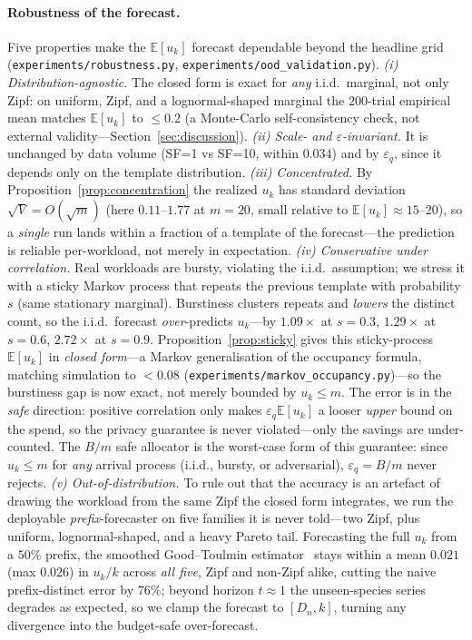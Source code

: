 \documentclass[sigconf,nonacm]{acmart}
\newcommand{\eps}{\varepsilon}
\newcommand{\E}{\mathbb{E}}
\begin{document}
\paragraph{Robustness of the forecast.} Five properties make the $\E[u_k]$ forecast dependable beyond the headline grid (\texttt{experiments/robustness.py}, \texttt{experiments/ood\_validation.py}). \emph{(i) Distribution-agnostic.} The closed form is exact for \emph{any} i.i.d.\ marginal, not only Zipf: on uniform, Zipf, and a lognormal-shaped marginal the $200$-trial empirical mean matches $\E[u_k]$ to $\le 0.2$ (a Monte-Carlo self-consistency check, not external validity---Section~\ref{sec:discussion}). \emph{(ii) Scale- and $\eps$-invariant.} It is unchanged by data volume (SF=1 vs SF=10, within $0.034$) and by $\eps_q$, since it depends only on the template distribution. \emph{(iii) Concentrated.} By Proposition~\ref{prop:concentration} the realized $u_k$ has standard deviation $\sqrt V=O(\sqrt m)$ (here $0.11$--$1.77$ at $m{=}20$, small relative to $\E[u_k]\approx15$--$20$), so a \emph{single} run lands within a fraction of a template of the forecast---the prediction is reliable per-workload, not merely in expectation. \emph{(iv) Conservative under correlation.} Real workloads are bursty, violating the i.i.d.\ assumption; we stress it with a sticky Markov process that repeats the previous template with probability $s$ (same stationary marginal). Burstiness clusters repeats and \emph{lowers} the distinct count, so the i.i.d.\ forecast \emph{over}-predicts $u_k$---by $1.09\times$ at $s{=}0.3$, $1.29\times$ at $s{=}0.6$, $2.72\times$ at $s{=}0.9$. Proposition~\ref{prop:sticky} gives this sticky-process $\E[u_k]$ in \emph{closed form}---a Markov generalisation of the occupancy formula, matching simulation to $<0.08$ (\texttt{experiments/markov\_occupancy.py})---so the burstiness gap is now exact, not merely bounded by $u_k\le m$. The error is in the \emph{safe} direction: positive correlation only makes $\eps_q\E[u_k]$ a looser \emph{upper} bound on the spend, so the privacy guarantee is never violated---only the savings are under-counted. The $B/m$ safe allocator is the worst-case form of this guarantee: since $u_k\le m$ for \emph{any} arrival process (i.i.d., bursty, or adversarial), $\eps_q=B/m$ never rejects. \emph{(v) Out-of-distribution.} To rule out that the accuracy is an artefact of drawing the workload from the same Zipf the closed form integrates, we run the deployable \emph{prefix}-forecaster on five families it is never told---two Zipf, plus uniform, lognormal-shaped, and a heavy Pareto tail. Forecasting the full $u_k$ from a $50\%$ prefix, the smoothed Good--Toulmin estimator~\cite{orlitsky2016unseen} stays within a mean $0.021$ (max $0.026$) in $u_k/k$ across \emph{all five}, Zipf and non-Zipf alike, cutting the naive prefix-distinct error by $76\%$; beyond horizon $t\approx1$ the unseen-species series degrades as expected, so we clamp the forecast to $[D_n,k]$, turning any divergence into the budget-safe over-forecast.
\end{document}
